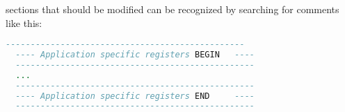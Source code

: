 sections that should be modified can be recognized by searching for comments like this:
\begin{lstlisting}[language=VHDL, frame=single, caption=customizable sections]
  ------------------------------------------------
  ---- Application specific registers BEGIN   ----
  ------------------------------------------------
  ...
  ------------------------------------------------
  ---- Application specific registers END     ----
  ------------------------------------------------
\end{lstlisting}


\newpage